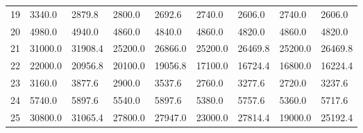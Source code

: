\begin{tabular}{|r|l|l|l|l|l|l|l|l|}
  19 & 3340.0 & 2879.8 & 2800.0 & 2692.6 & 2740.0 & 2606.0 & 2740.0 & 2606.0 \\ 
  20 & 4980.0 & 4940.0 & 4860.0 & 4840.0 & 4860.0 & 4820.0 & 4860.0 & 4820.0 \\ 
  21 & 31000.0 & 31908.4 & 25200.0 & 26866.0 & 25200.0 & 26469.8 & 25200.0 & 26469.8 \\ 
  22 & 22000.0 & 20956.8 & 20100.0 & 19056.8 & 17100.0 & 16724.4 & 16800.0 & 16224.4 \\ 
  23 & 3160.0 & 3877.6 & 2900.0 & 3537.6 & 2760.0 & 3277.6 & 2720.0 & 3237.6 \\ 
  24 & 5740.0 & 5897.6 & 5540.0 & 5897.6 & 5380.0 & 5757.6 & 5360.0 & 5717.6 \\ 
  25 & 30800.0 & 31065.4 & 27800.0 & 27947.0 & 23000.0 & 27814.4 & 19000.0 & 25192.4 \\ 
\end{tabular}
